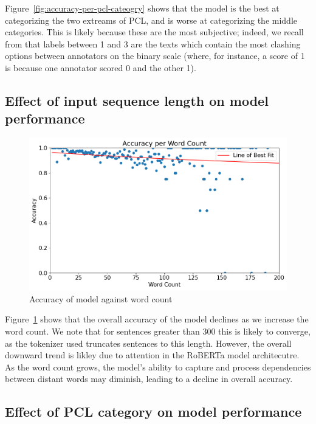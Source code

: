 \documentclass[11pt,a4paper]{article}
\begin{document}
Figure~\ref{fig:accuracy-per-pcl-cateogry} shows that the model is the best at categorizing the two extreams of PCL, and is worse at categorizing the middle categories. This is likely because these are the most subjective; indeed, we recall from \citet{perez-almendros-etal-2020-dont} that labels between 1 and 3 are the texts which contain the most clashing options between annotators on the binary scale (where, for instance, a score of 1 is because one annotator scored 0 and the other 1).

\subsection*{Effect of input sequence length on model performance}

\begin{figure}[H]
    \centering
    \includegraphics[width=\linewidth]{figures/accuracy_due_to_word_length.png}
    \caption{Accuracy of model against word count}
    \label{fig:accuracy-word-count}
\end{figure}

Figure~\ref{fig:accuracy-word-count} shows that the overall accuracy of the model declines as we increase the word count. We note that for sentences greater than $300$ this is likely to converge, as the tokenizer used truncates sentences to this length. However, the overall downward trend is likley due to attention in the RoBERTa model architecutre. As the word count grows, the model's ability to capture and process dependencies between distant words may diminish, leading to a decline in overall accuracy.

\subsection*{Effect of PCL category on model performance}
\end{document}
